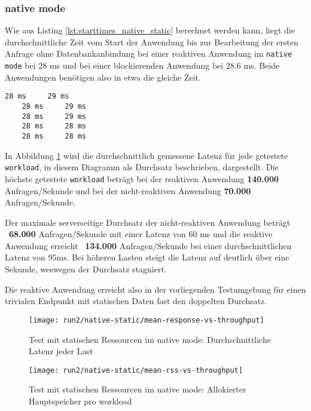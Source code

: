 \subsubsection{native mode}
\label{subsubsec:static_native_mode}
Wie aus Listing \ref{lst:starttimes_native_static} berechnet werden kann, liegt die durchschnittliche Zeit vom Start der Anwendung bis zur
Bearbeitung der ersten Anfrage ohne Datenbankanbindung bei einer reaktiven Anwendung im \verb|native mode| bei 28 ms und bei einer
blockierenden Anwendung bei 28.6 ms. Beide Anwendungen benötigen also in etwa die gleiche Zeit.

\begin{lstlisting}[caption=5 gemessene Startzeiten bis zur Bearbeitung der ersten Anfrage: links ist die reaktive Anwendung und rechts
    die blockierende Anwendung, captionpos=b, label=lst:starttimes_native_static]
    28 ms     29 ms
    28 ms     29 ms
    28 ms     29 ms
    28 ms     28 ms
    28 ms     28 ms
\end{lstlisting}

In Abbildung \ref{fig:native_static_mean_response} wird die durchschnittlich gemessene Latenz für jede getestete \verb|workload|,
in diesem Diagramm als Durchsatz beschrieben, dargestellt.
Die höchste getestete \verb|workload| beträgt bei der reaktiven Anwendung \textbf{140.000} Anfragen/Sekunde und bei der
nicht-reaktiven Anwendung \textbf{70.000} Anfragen/Sekunde.

Der maximale serverseitige Durchsatz der nicht-reaktiven Anwendung beträgt ~\textbf{68.000} Anfragen/Sekunde mit einer
Latenz von 60 ms und
die reaktive Anwendung erreicht ~\textbf{134.000} Anfragen/Sekunde bei einer durchschnittlichen Latenz von 95ms.
Bei höheren Lasten steigt die Latenz auf deutlich über eine Sekunde, weswegen der Durchsatz stagniert.

Die reaktive Anwendung erreicht also in der vorliegenden Testumgebung für einen trivialen
Endpunkt mit statischen Daten fast den doppelten Durchsatz.
\begin{figure}[ht!]
    \centering
    \texttt{[image: run2/native-static/mean-response-vs-throughput]}
    \caption{Test mit statischen Ressourcen im native mode: Durchschnittliche Latenz jeder Last}
    \label{fig:native_static_mean_response}
\end{figure}

\begin{figure}[ht!]
    \centering
    \texttt{[image: run2/native-static/mean-rss-vs-throughput]}
    \caption{Test mit statischen Ressourcen im native mode: Allokierter Hauptspeicher pro workload}
    \label{fig:native_static_mean_rss}
\end{figure}
\newpage

